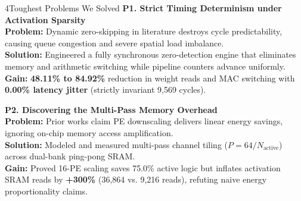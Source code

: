 \documentclass{article}
\newcommand{\subhead}[1]{{\color{iitmaroon}\bfseries #1}}
\begin{document}
\begin{minipage}[t]{0.488\textwidth}\vspace{0pt}
\begin{posterblock}[equal height group=rowA]{4}{Toughest Problems We Solved}
\subhead{P1. Strict Timing Determinism under Activation Sparsity}\\
\textbf{Problem:} Dynamic zero-skipping in literature destroys cycle predictability, causing queue congestion and severe spatial load imbalance.\\
\textbf{Solution:} Engineered a fully synchronous zero-detection engine that eliminates memory and arithmetic switching while pipeline counters advance uniformly.\\
\textbf{Gain:} \textbf{48.11\% to 84.92\%} reduction in weight reads and MAC switching with \textbf{0.00\% latency jitter} (strictly invariant 9,569 cycles).

\vspace{0.35em}
\subhead{P2. Discovering the Multi-Pass Memory Overhead}\\
\textbf{Problem:} Prior works claim PE downscaling delivers linear energy savings, ignoring on-chip memory access amplification.\\
\textbf{Solution:} Modeled and measured multi-pass channel tiling ($P = 64/N_{\text{active}}$) across dual-bank ping-pong SRAM.\\
\textbf{Gain:} Proved 16-PE scaling saves 75.0\% active logic but inflates activation SRAM reads by \textbf{+300\%} (36,864 vs. 9,216 reads), refuting naive energy proportionality claims.
\end{posterblock}
\end{minipage}%
\hfill
\end{document}
